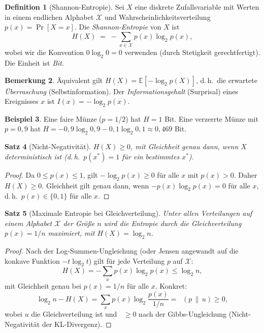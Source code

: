 \documentclass[12pt,a4paper]{amsart}
\newtheorem{theorem}{Satz}[section]
\theoremstyle{definition}
\newtheorem{definition}[theorem]{Definition}
\newtheorem{beispiel}[theorem]{Beispiel}
\newtheorem{bemerkung}[theorem]{Bemerkung}
\theoremstyle{remark}
\DeclareMathOperator{\KL}{D_{KL}}
\newcommand{\E}{\mathbb{E}}
\begin{document}
\begin{definition}[Shannon-Entropie]
Sei $X$ eine diskrete Zufallsvariable mit Werten in einem endlichen Alphabet
$\mathcal{X}$ und Wahrscheinlichkeitsverteilung $p(x) = \Pr[X = x]$.
Die \emph{Shannon-Entropie} von $X$ ist
\begin{equation}\label{eq:entropie}
  H(X) \;=\; -\sum_{x \in \mathcal{X}} p(x)\log_2 p(x),
\end{equation}
wobei wir die Konvention $0 \log_2 0 = 0$ verwenden (durch Stetigkeit gerechtfertigt).
Die Einheit ist \emph{Bit}.
\end{definition}

\begin{bemerkung}
Äquivalent gilt $H(X) = \E[-\log_2 p(X)]$, d.\,h.\ die erwartete
\emph{Überraschung} (Selbstinformation). Der \emph{Informationsgehalt} (Surprisal)
eines Ereignisses $x$ ist $I(x) = -\log_2 p(x)$.
\end{bemerkung}

\begin{beispiel}
Eine faire Münze ($p = 1/2$) hat $H = 1$ Bit. Eine verzerrte Münze mit $p = 0{,}9$
hat $H = -0{,}9 \log_2 0{,}9 - 0{,}1 \log_2 0{,}1 \approx 0{,}469$ Bit.
\end{beispiel}

\begin{theorem}[Nicht-Negativität]\label{satz:nichtneg}
$H(X) \geq 0$, mit Gleichheit genau dann, wenn $X$ deterministisch ist
(d.\,h.\ $p(x^*)=1$ für ein bestimmtes $x^*$).
\end{theorem}
\begin{proof}
Da $0 \leq p(x) \leq 1$, gilt $-\log_2 p(x) \geq 0$ für alle $x$ mit
$p(x)>0$. Daher $H(X) \geq 0$. Gleichheit gilt genau dann, wenn
$-p(x)\log_2 p(x)=0$ für alle $x$, d.\,h.\ $p(x) \in \{0,1\}$ für alle $x$.
\end{proof}

\begin{theorem}[Maximale Entropie bei Gleichverteilung]\label{satz:maxent}
Unter allen Verteilungen auf einem Alphabet $\mathcal{X}$ der Größe $n$ wird
die Entropie durch die Gleichverteilung $p(x) = 1/n$ maximiert, mit
$H(X) = \log_2 n$.
\end{theorem}
\begin{proof}
Nach der Log-Summen-Ungleichung (oder Jensen angewandt auf die konkave Funktion
$-t\log_2 t$) gilt für jede Verteilung $p$ auf $\mathcal{X}$:
\[
  H(X) = -\sum_x p(x)\log_2 p(x) \leq \log_2 n,
\]
mit Gleichheit genau bei $p(x) = 1/n$ für alle $x$. Konkret:
\[
  \log_2 n - H(X) = \sum_x p(x)\log_2\!\frac{p(x)}{1/n} = \KL(p \,\|\, u) \geq 0,
\]
wobei $u$ die Gleichverteilung ist und $\KL \geq 0$ nach der Gibbs-Ungleichung
(Nicht-Negativität der KL-Divergenz).
\end{proof}
\end{document}
